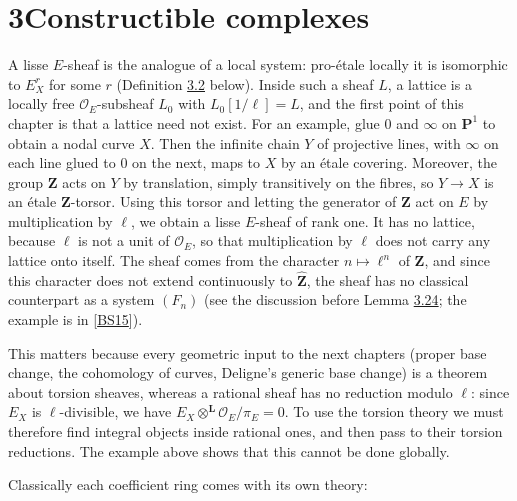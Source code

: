 \documentclass[11pt]{article}
\begin{document}
\section*{\texorpdfstring{3\quad Constructible complexes}{3 Constructible complexes}}
\label{bp193}%
\label{bp194}%
A lisse \(E\)-sheaf is the analogue of a local system: pro-étale locally it is isomorphic to \(E_X^r\) for some \(r\) (Definition \hyperref[bp201]{3.2} below). Inside such a sheaf \(L\), a lattice is a locally free \(\mathcal O_E\)-subsheaf \(L_0\) with \(L_0[1/\ell]=L\), and the first point of this chapter is that a lattice need not exist. For an example, glue \(0\) and \(\infty\) on \(\mathbf P^1\) to obtain a nodal curve \(X\). Then the infinite chain \(Y\) of projective lines, with \(\infty\) on each line glued to \(0\) on the next, maps to \(X\) by an étale covering. Moreover, the group \(\mathbf Z\) acts on \(Y\) by translation, simply transitively on the fibres, so \(Y\to X\) is an étale \(\mathbf Z\)-torsor. Using this torsor and letting the generator of \(\mathbf Z\) act on \(E\) by multiplication by \(\ell\), we obtain a lisse \(E\)-sheaf of rank one. It has no lattice, because \(\ell\) is not a unit of \(\mathcal O_E\), so that multiplication by \(\ell\) does not carry any lattice onto itself. The sheaf comes from the character \(n\mapsto\ell^n\) of \(\mathbf Z\), and since this character does not extend continuously to \(\widehat{\mathbf Z}\), the sheaf has no classical counterpart as a system \((F_n)\) (see the discussion before Lemma \hyperref[bp269]{3.24}; the example is in [\hyperref[bp705]{BS15}]).

This matters because every geometric input to the next chapters (proper base change, the cohomology of curves, Deligne's generic base change) is a theorem about torsion sheaves, whereas a rational sheaf has no reduction modulo \(\ell\): since \(E_X\) is \(\ell\)-divisible, we have \(E_X\otimes^{\mathbf L}\mathcal O_E/\pi_E=0\). To use the torsion theory we must therefore find integral objects inside rational ones, and then pass to their torsion reductions. The example above shows that this cannot be done globally.

Classically each coefficient ring comes with its own theory:
\end{document}

